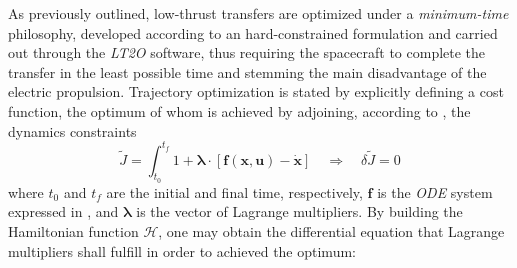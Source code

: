 %
As previously outlined, low-thrust transfers are optimized under a \emph{minimum-time} philosophy, developed according to an hard-constrained formulation and carried out through the \emph{LT2O} software, thus requiring the spacecraft to complete the transfer in the least possible time and stemming the main disadvantage of the electric propulsion. 
Trajectory optimization is stated by explicitly defining a cost function, the optimum of whom is achieved by adjoining, according to \cite{bryson1975applied}, the dynamics constraints
%
\begin{equation}
\tilde{J} = \int_{t_0}^{t_f} 1 + \boldsymbol{\lambda} \cdot \left[ \mathbf{f}(\mathbf{x},\mathbf{u}) - \mathbf{\dot{x}} \right] 
\quad \Rightarrow \quad \delta \tilde{J} = 0
\end{equation}
%
where $t_0$ and $t_f$ are the initial and final time, respectively, $\mathbf{f}$ is the \textit{ODE} system expressed in , and $\boldsymbol{\lambda}$ is the vector of Lagrange multipliers. By building the Hamiltonian function $\mathcal{H}$, one may obtain the differential equation that Lagrange multipliers shall fulfill in order to achieved the optimum:
